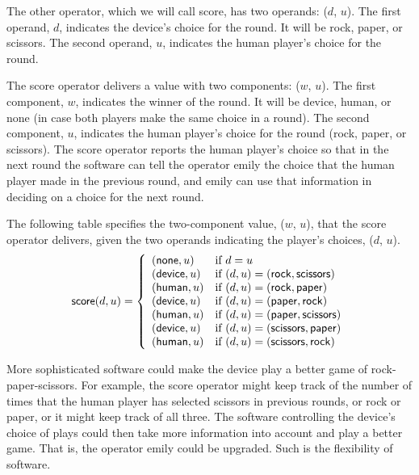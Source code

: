 The other operator, which we will call \textsf{score},
has two operands: ($d$, $u$).
The first operand, $d$,
indicates the  device's choice for the round.
It will be \textsf{rock}, \textsf{paper}, or \textsf{scissors}.
The second operand, $u$, indicates the human player's choice for the round.

The \textsf{score} operator delivers a value with two components: ($w$, $u$).
The first component, $w$, indicates the winner of the round.
It will be \textsf{device}, \textsf{human}, or \textsf{none}
(in case both players make the same choice in a round).
The second component, $u$, indicates the human player's choice for the round
(\textsf{rock}, \textsf{paper}, or \textsf{scissors}).
The \textsf{score} operator reports the human player's choice so that
in the next round the software
can tell the operator \textsf{emily}
the choice that the human player made in the previous round,
and \textsf{emily} can use that information in deciding on a choice
for the next round.

The following table specifies
the two-component value, ($w$, $u$), that the \textsf{score} operator
delivers, given the two operands indicating the player's choices, ($d$, $u$).
\begin{displaymath}
\textsf{score}(d,u) =
   \left\{
        \begin{array}{ll}
        (\mbox{\textsf{none}}, u)   & \mbox{if } d = u \\
        (\mbox{\textsf{device}}, u) & \mbox{if } (d,u) = (\mbox{\textsf{rock}}, \mbox{\textsf{scissors}}) \\
        (\mbox{\textsf{human}}, u)  & \mbox{if } (d,u) = (\mbox{\textsf{rock}}, \mbox{\textsf{paper}}) \\
        (\mbox{\textsf{device}}, u) & \mbox{if } (d,u) = (\mbox{\textsf{paper}}, \mbox{\textsf{rock}}) \\
        (\mbox{\textsf{human}}, u)  & \mbox{if } (d,u) = (\mbox{\textsf{paper}}, \mbox{\textsf{scissors}}) \\
        (\mbox{\textsf{device}}, u) & \mbox{if } (d,u) = (\mbox{\textsf{scissors}}, \mbox{\textsf{paper}}) \\
        (\mbox{\textsf{human}}, u)  & \mbox{if } (d,u) = (\mbox{\textsf{scissors}}, \mbox{\textsf{rock}}) \\
        \end{array}
   \right.
\end{displaymath}

More sophisticated software could make the device play a better game of
rock-paper-scissors.
For example, the \textsf{score} operator might
keep track of the number of times that the human player has selected scissors
in previous rounds, or rock or paper, or it might keep track of all three.
The software controlling the device's choice of plays could
then take more information into account and play a better game.
That is, the operator \textsf{emily} could be upgraded.
Such is the flexibility of software.

